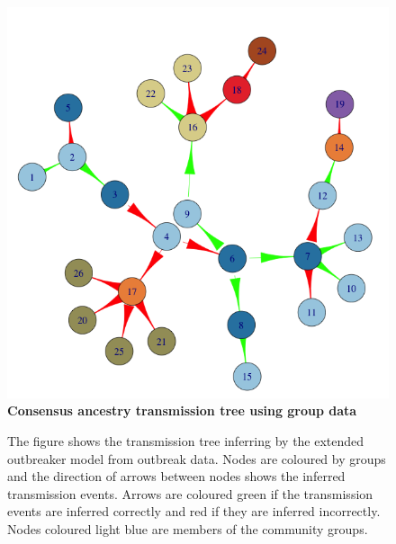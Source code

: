 \documentclass[11pt,a4paper]{report}
\begin{document}
\begin{figure}[h!]
\centering
\includegraphics[scale=0.5]{tree_with_grps.png} \newline
{\bf Consensus ancestry transmission tree using group data}
\caption{The figure shows the transmission tree inferring by the extended outbreaker model from outbreak data. Nodes are coloured by groups and the direction of arrows between nodes shows the inferred transmission events. Arrows are coloured green if the transmission events are inferred correctly and red if they are inferred incorrectly. Nodes coloured light blue are members of the community groups.}
\end{figure}
\end{document}
